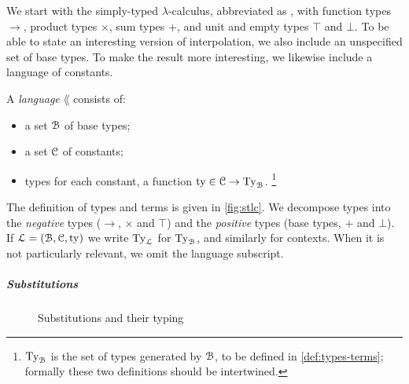 \documentclass[a4paper,UKenglish,cleveref, autoref, thm-restate]{lipics-v2021}
\begin{document}
We start with the simply-typed \(\lambda\)-calculus,
abbreviated as \stlcp,
with function types \(\to\), product types \(\times\),
sum types \(+\), and unit and empty types \(\top\) and \(\bot\).
To be able to state an interesting version of interpolation, we also
include an unspecified set of base types.
To make the result more interesting,
we likewise include a language of constants.

\begin{definition}
  \label{def:lang}
  A \emph{language} \(\lang\) consists of:
  \begin{itemize}
    \item a set \(\mathcal{B}\) of base types;
    \item a set \(\mathcal{C}\) of constants;
    \item types for each constant, \ie
      a function \(\tyof \in \const \to \Ty_{\base}\).%
    \footnote{\(\Ty_{\base}\) is the set of types generated by
    \(\mathcal{B}\), to be defined in \cref{def:types-terms}; formally these
    two definitions should be intertwined.} 
  \end{itemize}
\end{definition}

\begin{definition}
\label{def:types-terms}
The definition of types and terms is given in \cref{fig:stlc}.
We decompose types into the \emph{negative} types (\(\to\), \(\times\) and
\(\top\)) and the \emph{positive} types (base types, \(+\) and \(\bot\)).
If \(\mathcal{L} = (\mathcal{B},\mathcal{C},\operatorname{ty})\) we write
\(\Ty_{\lang}\) for \(\Ty_{\base}\), and similarly for contexts.
When it is not particularly relevant, we omit the language subscript.
\end{definition}

\subparagraph*{Substitutions}

\begin{figure}
\caption{ Substitutions and their typing}
\label{fig:subst}
\end{figure}
\end{document}
